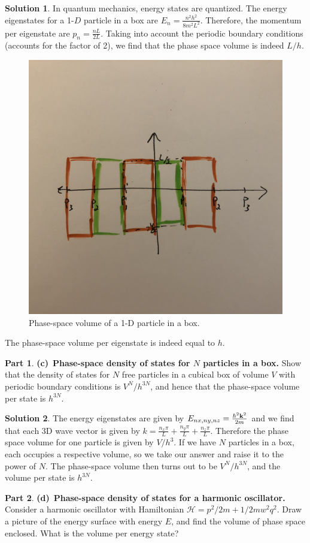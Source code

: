 \documentclass[11pt]{article}
\theoremstyle{definition}
\newtheorem{question}{Part}[section]
\newtheorem*{solution}{Solution}
\numberwithin{equation}{section}
\numberwithin{figure}{section}
\begin{document}
\begin{solution}
In quantum mechanics, energy states are quantized. The energy eigenstates for a 1-$D$ particle in a box are $E_n = \frac{n^2 h^2}{8m^2 L^2}$. Therefore, the momentum per eigenstate are $p_n = \frac{nL}{2L}$. Taking into account the periodic boundary conditions (accounts for the factor of 2), we find that the phase space volume is indeed $L/h$.
\begin{figure}[h!]
\centering
\includegraphics[width=.3\linewidth]{Final_Fig5}
\caption{Phase-space volume of a 1-D particle in a box.}
\end{figure}
The phase-space volume per eigenstate is indeed equal to $h$.
\end{solution}


\begin{question}
\textbf{(c)}~\textbf{Phase-space density of states for $N$ particles in a box.} Show that the density of states for $N$ free particles in a cubical box of volume $V$ with periodic boundary conditions is $V^N/h^{3N}$, and hence that the phase-space volume per state is $h^{3N}$.
\end{question}

\begin{solution}
The energy eigenstates are given by $E_{nx,ny,nz} = \frac{\hbar^2 \vb{k}^2}{2m}$ and we find that each 3D wave vector is given by
$k = \frac{n_x \pi}{L} + \frac{n_y \pi}{L} + \frac{n_z \pi}{L}$. Therefore the phase space volume for one particle is given by $V/h^3$. If we have $N$ particles in a box, each occupies a respective volume, so we take our answer and raise it to the power of $N$. The phase-space volume then turns out to be $V^N/h^{3N}$, and the volume per state is $h^{3N}$.
\end{solution}


\begin{question}
\textbf{(d)}~\textbf{Phase-space density of states for a harmonic oscillator.} Consider a harmonic oscillator with Hamiltonian $\mathcal{H} = p^2/2m + 1/2 mw^2q^2$. Draw a picture of the energy surface with energy $E$, and find the volume of phase space enclosed. What is the volume per energy state?
\end{question}
\end{document}
